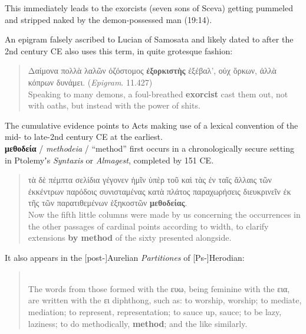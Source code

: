 \noindent{}This immediately leads to the exorcists (seven sons of Sceva) %
getting pummeled and stripped naked by the demon-possessed man (19:14). %

An epigram falsely ascribed to Lucian of Samosata and likely dated to after the 2nd century CE %
also uses this term, in quite grotesque fashion: %

\vspace*{3mm} 
 \begin{quote}Δαίμονα πολλὰ λαλῶν ὀζόστομος \textbf{ἐξορκιστὴς} \newline
   ἐξέβαλ’, οὐχ ὅρκων, ἀλλὰ κόπρων δυνάμει. (\textit{Epigram}. 11.427) \\[1mm] %
 Speaking to many demons, a foul-breathed \textbf{exorcist} \newline
 cast them out, not with oaths, but instead with the power of shits. \end{quote} %
 \vspace*{3mm} 

\noindent{}The cumulative evidence points to Acts making use of a lexical convention %
of the mid- to late-2nd century CE at the earliest. \\[1.5mm] %

\noindent{}\textbf{μεθοδεία} / \textit{methodeia} / “method” %
first occurs in a chronologically secure setting %
in Ptolemyʼs \textit{Syntaxis} or \textit{Almagest}, %
completed by 151 CE. %

\vspace*{3mm} 
 \begin{quote}τὰ δὲ πέμπτα σελίδια γέγονεν ἡμῖν ὑπὲρ τοῦ καὶ
 τὰς ἐν ταῖς ἄλλαις τῶν ἐκκέντρων παρόδοις συνισταμένας %
 κατὰ πλάτος παραχωρήσεις διευκρινεῖν ἐκ τῆς τῶν
 παρατιθεμένων ἑξηκοστῶν \textbf{μεθοδείας}. \\[1mm] %
 Now the fifth little columns were made by us concerning %
 the occurrences in the other passages of cardinal points %
 according to width, to clarify extensions \textbf{by method} %
 of the sixty presented alongside. \end{quote} %
 \vspace*{3mm}
%

\noindent{}It also appears in the [post-]Aurelian \textit{Partitiones} of [Ps-]Herodian: %

\vspace*{3mm} 
 \begin{quote} \\[1mm] %
 The words from those formed with the ευω, %
 being feminine with the εια, %
 are written with the ει diphthong, such as: %
 to worship, worship; to mediate, mediation; to represent, representation; %
 to sauce up, sauce; to be lazy, laziness; to do methodically, \textbf{method}; %
 and the like similarly. %
 \end{quote} %
 \vspace*{3mm}

